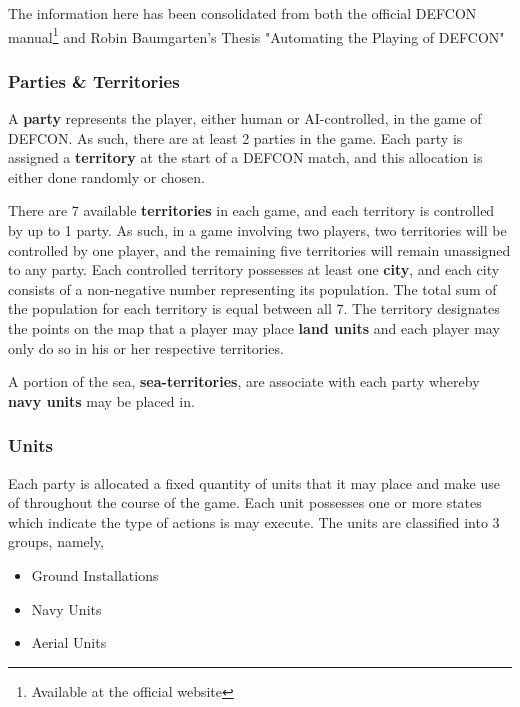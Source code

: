         The information here has been consolidated from both the official DEFCON manual\footnote{Available at the official website} and Robin Baumgarten's Thesis "Automating the Playing of DEFCON"~\cite{robbot}
        
        \subsubsection{Parties \& Territories} 
        
        A \textbf{party} represents the player, either human or AI-controlled, in the game of DEFCON. As such, there are at least 2 parties in the game. Each party is assigned a \textbf{territory} at the start of a DEFCON match, and this allocation is either done randomly or chosen.
         
        There are 7 available \textbf{territories} in each game, and each territory is controlled by up to 1 party. As such, in a game involving two players, two territories will be controlled by one player, and the remaining five territories will remain unassigned to any party. Each controlled territory possesses at least one \textbf{city}, and each city consists of a non-negative number representing its population. The total sum of the population for each territory is equal between all 7. The territory designates the points on the map that a player may place \textbf{land units} and each player may only do so in his or her respective territories.
                          
        A portion of the sea, \textbf{sea-territories}, are associate with each party whereby \textbf{navy units} may be placed in.       
        
        \subsubsection{Units}
        Each party is allocated a fixed quantity of units that it may place and make use of throughout the course of the game. Each unit possesses one or more states which indicate the type of actions is may execute. The units are classified into 3 groups, namely,

        \begin{itemize}
        \item Ground Installations
        \item Navy Units
        \item Aerial Units
        \end{itemize}
         
